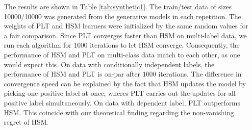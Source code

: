 \documentclass{article}
\newcommand{\Algo}[1]{\textsc{#1}}
\renewcommand{\vec}[1]{\boldsymbol{#1}}
\newcommand{\bx}{\vec{x}}
\newcommand{\bw}{\vec{w}}
\begin{document}
{The results are shown in Table \ref{tab:synthetic1}. The train/test data of sizes 10000/10000 was generated from the generative models in each repetition. The weights of \Algo{PLT} and \Algo{HSM} learners were initialized by the same random values for a fair comparison. Since \Algo{PLT} converges faster than \Algo{HSM} on multi-label data, we run each algorithm for 1000 iterations to let \Algo{HSM} converge. Consequently, the performance of \Algo{HSM} and \Algo{PLT} on multi-class data match to each other, as one would expect this. On data with conditionally independent labels, the performance of \Algo{HSM} and \Algo{PLT} is on-par after $1000$ iterations. The difference in convergence speed can be explained by the fact that \Algo{HSM} updates the model by picking one positive label at once, wheres \Algo{PLT}  carries out the updates for all positive label simultaneously. On data with dependent label, \Algo{PLT} outperforms \Algo{HSM}. This coincide with our theoretical finding regarding the non-vanishing regret of \Algo{HSM}. 




}
\end{document}
